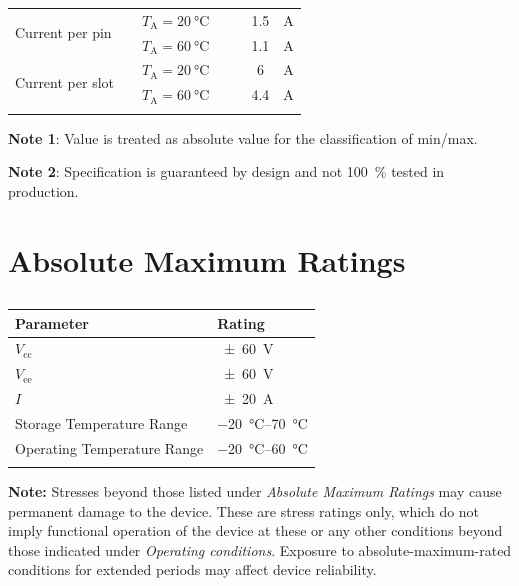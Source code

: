 \documentclass[10pt]{datasheet}
\begin{document}
\begin{table}[h!]
\begin{threeparttable}
\begin{tabularx}{\textwidth}{l | c | X | c c c | c}
            \hline
            \multirow{2}{*}{Current per pin} & & $T_\text{A} = \qty{20}{\celsius}$ & & & 1.5 & \unit{\A}\\
            & & $T_\text{A} = \qty{60}{\celsius}$ & & & 1.1 & \unit{\A}\\
            \multirow{2}{*}{Current per slot} & & $T_\text{A} = \qty{20}{\celsius}$ & & & 6 & \unit{\A}\\
            & & $T_\text{A} = \qty{60}{\celsius}$ & & & 4.4 & \unit{\A}\\
            \thickhline
        \end{tabularx}
        \begin{tablenotes}
            \item{\textbf{Note 1}: Value is treated as absolute value for the classification of min/max.}
            \item{\textbf{Note 2}: Specification is guaranteed by design and not \qty{100}{\percent} tested in production.}
        \end{tablenotes}
    \end{threeparttable}
\end{table}

\section{Absolute Maximum Ratings}

\begin{table}[h]
    \caption{}
    \begin{tabularx}{\textwidth}{l | X}
        \thickhline
        \textbf{Parameter} & \textbf{Rating} \hspace{5cm} \\
        \hline
        $V_\text{cc}$ & \qty{\pm 60}{\V} \\
        $V_\text{ee}$ & \qty{\pm 60}{\V} \\
        $I$ & \qty{\pm 20}{\A} \\
        Storage Temperature Range & \qtyrange{-20}{70}{\celsius}\\
        Operating Temperature Range & \qtyrange{-20}{60}{\celsius}\\
        \thickhline
    \end{tabularx}
\end{table}

\textbf{Note:} Stresses beyond those listed under \textit{Absolute Maximum Ratings} may cause permanent damage to the device. These are stress ratings only, which do not imply functional operation of the device at these or any other conditions beyond those indicated under \textit{Operating conditions}. Exposure to absolute-maximum-rated conditions for extended periods may affect device reliability.
\end{document}
